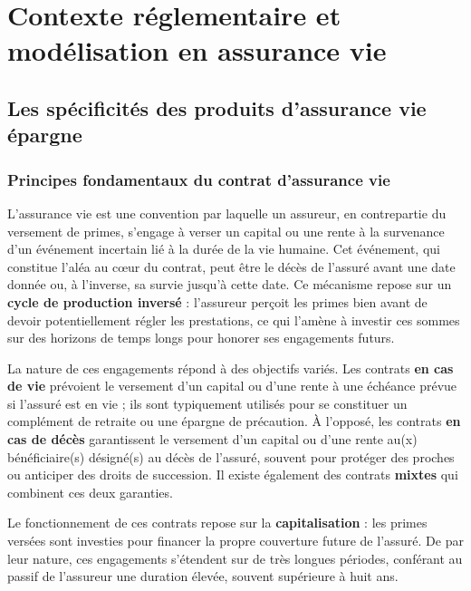 \chapter{Contexte réglementaire et modélisation en assurance vie}
\label{chap:contexte}

\section{Les spécificités des produits d'assurance vie épargne}
\label{sec:spec_av}

\subsection{Principes fondamentaux du contrat d'assurance vie}

L'assurance vie est une convention par laquelle un assureur, en contrepartie du versement de primes, s'engage à verser un capital ou une rente à la survenance d'un événement incertain lié à la durée de la vie humaine. Cet événement, qui constitue l'aléa au cœur du contrat, peut être le décès de l'assuré avant une date donnée ou, à l'inverse, sa survie jusqu'à cette date. Ce mécanisme repose sur un \textbf{cycle de production inversé} : l'assureur perçoit les primes bien avant de devoir potentiellement régler les prestations, ce qui l'amène à investir ces sommes sur des horizons de temps longs pour honorer ses engagements futurs.

\bigskip

La nature de ces engagements répond à des objectifs variés. Les contrats \textbf{en cas de vie} prévoient le versement d'un capital ou d'une rente à une échéance prévue si l'assuré est en vie ; ils sont typiquement utilisés pour se constituer un complément de retraite ou une épargne de précaution. À l'opposé, les contrats \textbf{en cas de décès} garantissent le versement d'un capital ou d'une rente au(x) bénéficiaire(s) désigné(s) au décès de l'assuré, souvent pour protéger des proches ou anticiper des droits de succession. Il existe également des contrats \textbf{mixtes} qui combinent ces deux garanties.

\bigskip

Le fonctionnement de ces contrats repose sur la \textbf{capitalisation} : les primes versées sont investies pour financer la propre couverture future de l'assuré. De par leur nature, ces engagements s'étendent sur de très longues périodes, conférant au passif de l'assureur une duration élevée, souvent supérieure à huit ans.

